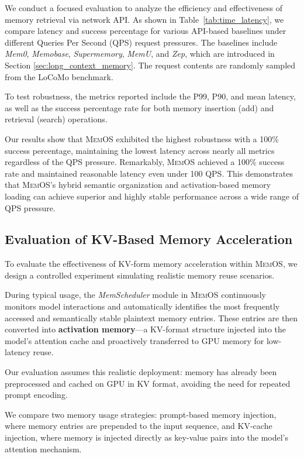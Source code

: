 \documentclass[]{memtensor}
\begin{document}


We conduct a focused evaluation to analyze the efficiency and effectiveness of memory retrieval via network API. As shown in Table~\ref{tab:time_latency}, we compare latency and success percentage for various API-based baselines under different Queries Per Second (QPS) request pressures. The baselines include \textit{Mem0}, \textit{Memobase}, \textit{Supermemory}, \textit{MemU}, and \textit{Zep}, which are introduced in Section \ref{sec:long_context_memory}. The request contents are randomly sampled from the LoCoMo benchmark.

To test robustness, the metrics reported include the P99, P90, and mean latency, as well as the success percentage rate for both memory insertion (add) and retrieval (search) operations.

Our results show that \textsc{MemOS} exhibited the highest robustness with a 100\% success percentage, maintaining the lowest latency across nearly all metrics regardless of the QPS pressure. Remarkably, \textsc{MemOS} achieved a 100\% success rate and maintained reasonable latency even under 100 QPS. This demonstrates that \textsc{MemOS}'s hybrid semantic organization and activation-based memory loading can achieve superior and highly stable performance across a wide range of QPS pressure.

\subsection{Evaluation of KV-Based Memory Acceleration}

To evaluate the effectiveness of KV-form memory acceleration within \textsc{MemOS}, we design a controlled experiment simulating realistic memory reuse scenarios.

During typical usage, the \textit{MemScheduler} module in \textsc{MemOS} continuously monitors model interactions and automatically identifies the most frequently accessed and semantically stable plaintext memory entries. These entries are then converted into \textbf{activation memory}—a KV-format structure injected into the model's attention cache and proactively transferred to GPU memory for low-latency reuse.

Our evaluation assumes this realistic deployment: memory has already been preprocessed and cached on GPU in KV format, avoiding the need for repeated prompt encoding.

We compare two memory usage strategies: prompt-based memory injection, where memory entries are prepended to the input sequence, and KV-cache injection, where memory is injected directly as key-value pairs into the model's attention mechanism.
\end{document}
